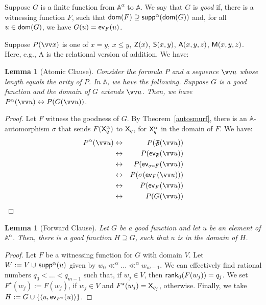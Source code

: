 \documentclass{amsart}
\renewcommand{\iff}{\leftrightarrow}
\renewcommand{\leq}{\leqslant}
\newcommand{\qedright}{\belowdisplayskip=-12pt}
\newtheorem{lem}[theorem]{Lemma}
\newcommand{\tupel}[1]{{\langle #1 \rangle}}
\newcommand{\verz}[1]{\{ #1 \}}
\newcommand{\mf}[1]{{\mathfrak {#1}}}
\newcommand{\X}{{\sf X}}
\begin{document}
Suppose $G$ is a finite function from $\mathbb A^\alpha$ to $\mathbb A$.
We say that $G$ is \emph{good} if, there is a witnessing function $F$, such that
${\sf dom}(F) \supseteq {\sf supp}^\alpha({\sf dom}(G))$ and, for all $u \in {\sf dom}(G)$,
we have $G(u) = {\sf ev}_F(u)$. 


Suppose $P(\vv x)$ is one of $x=y$, $x\leq y$, ${\sf Z}(x)$, ${\sf S}(x,y)$, ${\sf A}(x,y,z)$, ${\sf M}(x,y,z)$.
Here, e.g., {\sf A} is the relational version of addition. We have:

\begin{lem}[Atomic Clause]
Consider the formula $P$ and a sequence $\vv u$ whose length equals the arity of $P$. In $\mathbb A$, we have the following. Suppose $G$ is a good function and the domain of
$G$ extends $\vv u$.
Then, we have $P^\alpha(\vv u) \iff P(G(\vv u))$. 
\end{lem}

\begin{proof}
Let $F$ witness the goodness of $G$.
By Theorem~\ref{autosmurf}, there is an $\mathbb A$-automorphism $\sigma$ that sends  $F(\X_q^\alpha)$ to $\X_q$, for 
$\X_q^\alpha$ in the domain of $F$. 
We have:  \qedright
\begin{eqnarray*}
P^\alpha(\vv u) & \iff & P(\mf F(\vv u)) \\ 
& \iff  & P({\sf ev}_{\mf F}(\vv u)) \\
& \iff  & P({\sf ev}_{\sigma\circ F}(\vv u)) \\
& \iff  & P(\sigma({\sf ev}_{F}(\vv u))) \\
& \iff & P({\sf ev}_F(\vv u)) \\
& \iff & P(G(\vv u))
\end{eqnarray*}
\end{proof}

\begin{lem}[Forward Clause]
Let $G$ be a good function and let $u$ be an element of $\mathbb A^\alpha$.
Then, there is a good function $H \supseteq G$, such that $u$ is in the domain of
$H$.
\end{lem}

\begin{proof}
Let $F$ be a witnessing function for $G$ with domain $V$. Let
$W:= V \cup\, {\sf supp}^\alpha(u)$ given by $w_0\ll^\alpha \dots \ll^\alpha w_{m-1}$. We can effectively find rational numbers
$q_0 <\dots < q_{m-1}$ such that, if $w_j\in V$, then  ${\sf rank}_0(F(w_j)) = q_j$. We set $F^\star(w_j) := F(w_j)$, if
$w_j\in V$ and $F^\star(w_j) = \X_{q_j}$, otherwise. 
Finally, we take
$H := G \cup \verz{\tupel{u, {\sf ev}_{F^\star}(u)}}$.
\end{proof}
\end{document}
